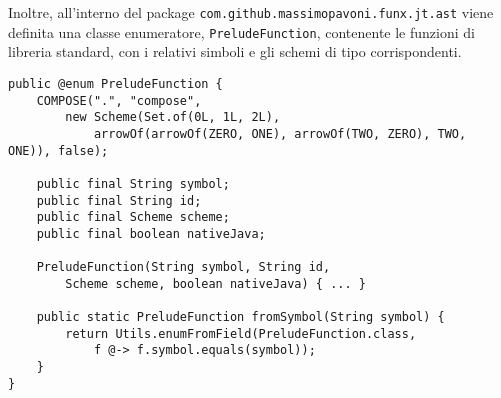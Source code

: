 Inoltre, all'interno del package \texttt{com.github.massimopavoni.funx.jt.ast} viene definita una classe enumeratore,
\texttt{PreludeFunction}, contenente le funzioni di libreria standard, con i relativi simboli e gli schemi di tipo corrispondenti.

\vspace{4mm}
\begin{lstlisting}[caption={Parte del codice di \texttt{PreludeFunction}}, style=javaCode, label={lst:5-6-preludefunction-java}]
public @enum PreludeFunction {
    COMPOSE(".", "compose",
        new Scheme(Set.of(0L, 1L, 2L),
            arrowOf(arrowOf(ZERO, ONE), arrowOf(TWO, ZERO), TWO, ONE)), false);

    public final String symbol;
    public final String id;
    public final Scheme scheme;
    public final boolean nativeJava;

    PreludeFunction(String symbol, String id,
        Scheme scheme, boolean nativeJava) { ... }

    public static PreludeFunction fromSymbol(String symbol) {
        return Utils.enumFromField(PreludeFunction.class,
            f @-> f.symbol.equals(symbol));
    }
}
\end{lstlisting}

\newpage

